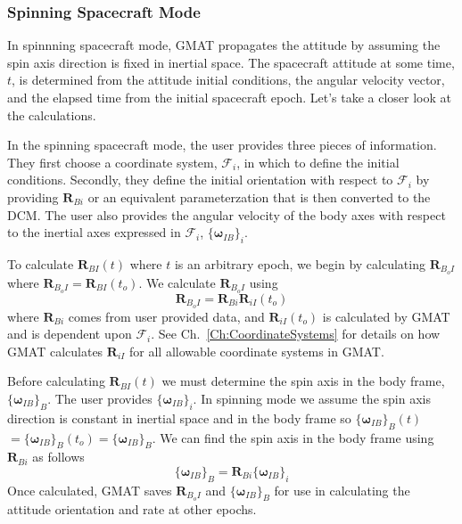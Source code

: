 \subsubsection{Spinning Spacecraft Mode}

In spinnning spacecraft mode, GMAT propagates the attitude by
assuming the spin axis direction is fixed in inertial space.  The
spacecraft attitude at some time, $t$, is determined from the
attitude initial conditions, the angular velocity vector, and the
elapsed time from the initial spacecraft epoch.  Let's take a closer
look at the calculations.

In the spinning spacecraft mode, the user provides three pieces of
information.  They first choose a coordinate system,
$\mathcal{F}_i$, in which to define the initial conditions.
Secondly, they define the initial orientation with respect to
$\mathcal{F}_i$ by providing $\mathbf{R}_{Bi}$ or an equivalent
parameterzation that is then converted to the DCM.   The user also
provides the angular velocity of the body axes with respect to the
inertial axes expressed in $\mathcal{F}_i$, $\{
\boldsymbol\omega_{IB}\}_i$.

To calculate $\mathbf{R}_{BI}(t)$ where $t$ is an arbitrary epoch,
we begin by calculating $\mathbf{R}_{B_{o}I}$ where
$\mathbf{R}_{B_{o}I} = \mathbf{R}_{BI}(t_o)$.  We calculate
$\mathbf{R}_{B_{o}I}$ using
%
\begin{equation}
     \mathbf{R}_{B_{o}I} =  \mathbf{R}_{Bi}\mathbf{R}_{iI}(t_o)
\end{equation}
%
where $\mathbf{R}_{Bi}$ comes from user provided data, and
$\mathbf{R}_{iI}(t_o)$ is calculated by GMAT and is dependent upon
$\mathcal{F}_i$.  See Ch.~\ref{Ch:CoordinateSystems} for details on
how GMAT calculates $\mathbf{R}_{iI}$ for all allowable coordinate
systems in GMAT.

Before calculating $\mathbf{R}_{BI}(t)$ we must determine the spin
axis in the body frame, $\{\boldsymbol\omega_{IB}\}_B$.  The user
provides $\{\boldsymbol\omega_{IB}\}_i$.  In spinning mode we assume
the spin axis direction is constant in inertial space and in the
body frame so $\{ \boldsymbol\omega_{IB} \}_B (t)$ $ = \{
\boldsymbol\omega_{IB} \}_B (t_o) = \{ \boldsymbol\omega_{IB} \}_B
$.  We can find the spin axis in the body frame using
$\mathbf{R}_{Bi}$ as follows
%
\begin{equation}
      \{ \boldsymbol\omega_{IB}\}_B = \mathbf{R}_{Bi} \{ \boldsymbol\omega_{IB}\}_i
\end{equation}
%
Once calculated, GMAT saves $\mathbf{R}_{B_{o}I}$ and $\{
\boldsymbol\omega_{IB}\}_B$ for use in calculating the attitude
orientation and rate at other epochs.

